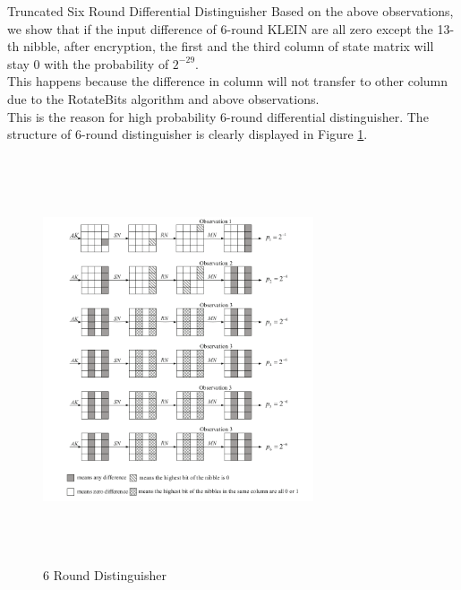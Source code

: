\begin{frame}{Truncated Six Round Differential Distinguisher}
Based on the above observations, we show that if the input difference of 6-round KLEIN are all zero except the 13-th nibble, after encryption, the first and the third column of state matrix will stay 0 with the probability of $2^{-29}$.\\
This happens because the difference in column will not transfer to other column due to the RotateBits algorithm and above observations. \\ This is the reason for high probability 6-round differential distinguisher.
The structure of 6-round distinguisher is clearly displayed in Figure \ref{fig:6distinguisher}.\\
\end{frame}
\begin{frame}
    
    \begin{figure}
    \centering
    \includegraphics[width= 8cm, height= 12cm, keepaspectratio]{./../images/6roundattack.png}
    \caption{6 Round Distinguisher \cite{reduced_round}}
    \label{fig:6distinguisher}
\end{figure}
\end{frame}

